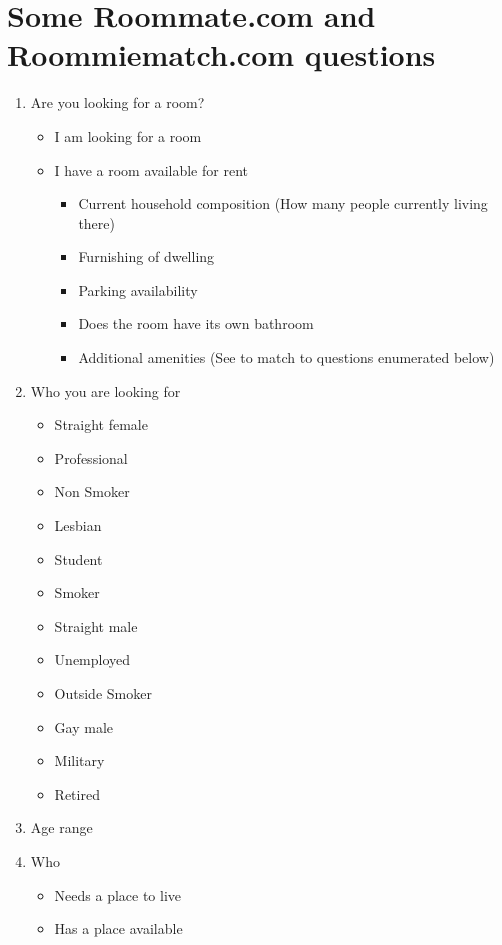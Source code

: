 \documentclass[journal]{IEEEtran}
\begin{document}
\section{Some Roommate.com and Roommiematch.com questions} %
\begin{enumerate}
    \item Are you looking for a room?
    \begin{itemize}
        \item I am looking for a room
        \item I have a room available for rent
        \begin{itemize}
            \item Current household composition (How many people currently living there)
            \item Furnishing of dwelling
            \item Parking availability
            \item Does the room have its own bathroom
            \item Additional amenities (See to match to questions enumerated below)
        \end{itemize}
    \end{itemize}
    \item Who you are looking for
    \begin{itemize}
        \item Straight female
        \item Professional
        \item Non Smoker
        \item Lesbian
        \item Student
        \item Smoker
        \item Straight male
        \item Unemployed
        \item Outside Smoker
        \item Gay male
        \item Military
        \item Retired
    \end{itemize}
    \item Age range
    \item Who
    \begin{itemize}
        \item Needs a place to live
        \item Has a place available

\end{itemize}
\end{enumerate}
\end{document}
